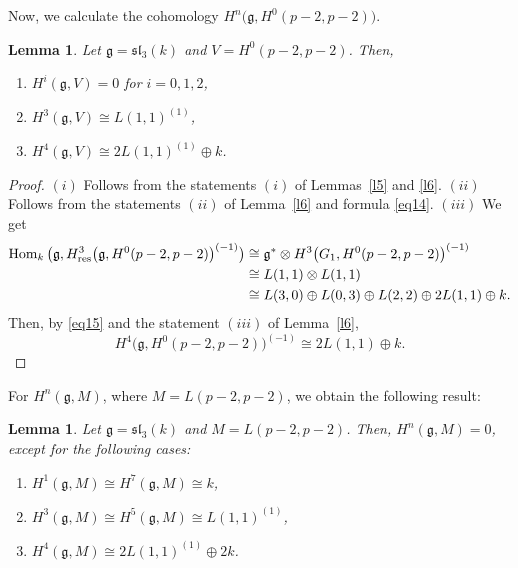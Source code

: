 \documentclass[pdftex]{sigma}%
\numberwithin{equation}{section}
\newtheorem{Lemma}[Theorem]{Lemma}
\begin{document}
Now, we calculate the cohomology $H^n\big(\mathfrak{g},H^0(p-2,p-2)\big)$.

\begin{Lemma}\label{l7}
Let $\mathfrak{g}=\mathfrak{sl}_3(k)$ and $V=H^0(p-2,p-2)$. Then,
\begin{enumerate}\itemsep=0pt
\item[$(i)$] $H^{i}(\mathfrak{g},V)=0 $ for $i=0,1,2$,
\item[$(ii)$] $H^{3}(\mathfrak{g},V)\cong L(1,1)^{(1)}$,
\item[$(iii)$] $H^4(\mathfrak{g},V)\cong 2L(1,1)^{(1)}\oplus k$.
\end{enumerate}
\end{Lemma}

\begin{proof}
$(i)$ Follows from the statements $(i)$ of Lemmas~\ref{l5} and \ref{l6}.
$(ii)$ Follows from the statements $(ii)$ of Lemma~\ref{l6} and formula \eqref{eq14}.
$(iii)$ We get
\begin{align*}
\operatorname{Hom}_k\big(\mathfrak{g},H^3_{\rm res}\big(\mathfrak{g},H^0(p-2,p-2)\big)^{(-1)}\big)&\cong \mathfrak{g}^*\otimes H^3\big(G_1,H^0(p-2,p-2)\big)^{(-1)}
\\
&\cong L(1,1)\otimes L(1,1)
\\
&\cong
L(3,0)\oplus L(0,3)\oplus L(2,2)\oplus 2L(1,1)\oplus k.
\end{align*}
Then, by \eqref{eq15} and the statement $(iii)$ of Lemma~\ref{l6},
\begin{equation*} H^4\big(\mathfrak{g},H^0(p-2,p-2)\big)^{(-1)}\cong 2L(1,1)\oplus k.
\end{equation*}
\renewcommand{\qed}{}
\end{proof}

For $H^n(\mathfrak{g},M)$, where $M=L(p-2,p-2)$, we obtain the following result:

\begin{Lemma}\label{l8}
Let $\mathfrak{g}=\mathfrak{sl}_3(k)$ and $M=L(p-2,p-2)$. Then, $H^n(\mathfrak{g},M)=0$, except for the following cases:

\begin{enumerate}\itemsep=0pt

\item[$(i)$] $H^{1}(\mathfrak{g},M)\cong H^{7}(\mathfrak{g},M)\cong k$,

\item[$(ii)$] $H^{3}(\mathfrak{g},M)\cong H^{5}(\mathfrak{g},M)\cong L(1,1)^{(1)}$,

\item[$(iii)$] $H^4(\mathfrak{g},M)\cong 2L(1,1)^{(1)}\oplus 2k$.

\end{enumerate}
\end{Lemma}
\end{document}
